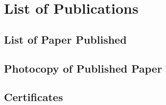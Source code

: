 \chapter{List of Publications}
\section{List of Paper Published}
\section{Photocopy of Published Paper}
\section{Certificates}